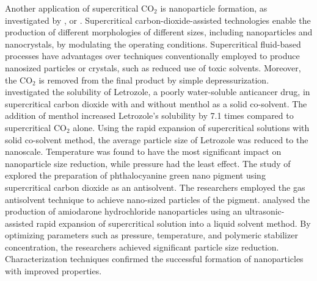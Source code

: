 \documentclass[../Article_Model_Parameters.tex]{subfiles}
\begin{document}
	Another application of supercritical CO$_2$ is nanoparticle formation, as investigated by \citet{Padrela2018}, \citet{Franco2021} or \citet{Sodeifian2022}. Supercritical carbon-dioxide-assisted technologies enable the production of different morphologies of different sizes, including nanoparticles and nanocrystals, by modulating the operating conditions. Supercritical fluid-based processes have advantages over techniques conventionally employed to produce nanosized particles or crystals, such as reduced use of toxic solvents. Moreover, the CO$_2$ is removed from the final product by simple depressurization. 
	\citet{Sodeifian2018} investigated the solubility of Letrozole, a poorly water-soluble anticancer drug, in supercritical carbon dioxide with and without menthol as a solid co-solvent. The addition of menthol increased Letrozole's solubility by 7.1 times compared to supercritical CO$_2$ alone. Using the rapid expansion of supercritical solutions with solid co-solvent method, the average particle size of Letrozole was reduced to the nanoscale. Temperature was found to have the most significant impact on nanoparticle size reduction, while pressure had the least effect. 
	The study of \citet{SaadatiArdestani2020} explored the preparation of phthalocyanine green nano pigment using supercritical carbon dioxide as an antisolvent. The researchers employed the gas antisolvent technique to achieve nano-sized particles of the pigment.
	\citet{Sodeifian2019} analysed the production of amiodarone hydrochloride nanoparticles using an ultrasonic-assisted rapid expansion of supercritical solution into a liquid solvent method. By optimizing parameters such as pressure, temperature, and polymeric stabilizer concentration, the researchers achieved significant particle size reduction. Characterization techniques confirmed the successful formation of nanoparticles with improved properties.
	
\end{document}
